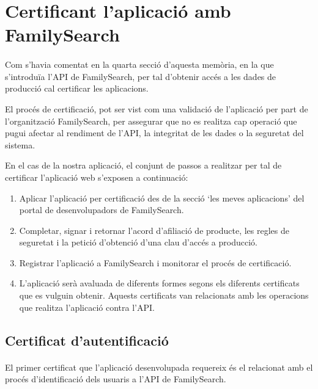\section{Certificant l'aplicació amb FamilySearch}\label{section:certification}

    \paragraph{}
    Com s'havia comentat en la quarta secció d'aquesta memòria, en la que s'introduïa l'API de FamilySearch, per tal d'obtenir accés a les dades de producció cal certificar les aplicacions.

    El procés de certificació, pot ser vist com una validació de l'aplicació per part de l'organització FamilySearch, per assegurar que no es realitza cap operació que pugui afectar al rendiment de l'API, la integritat de les dades o la seguretat del sistema.

    En el cas de la nostra aplicació, el conjunt de passos a realitzar per tal de certificar l'aplicació web s'exposen a continuació:

    \begin{enumerate}
        \item Aplicar l'aplicació per certificació des de la secció `les meves aplicacions' del portal de desenvolupadors de FamilySearch.
        \item Completar, signar i retornar l'acord d'afiliació de producte, les regles de seguretat i la petició d'obtenció d'una clau d'accés a producció.
        \item Registrar l'aplicació a FamilySearch i monitorar el procés de certificació.
        \item L'aplicació serà avaluada de diferents formes segons els diferents certificats que es vulguin obtenir. Aquests certificats van relacionats amb les operacions que realitza l'aplicació contra l'API.
    \end{enumerate}


    \subsection{Certificat d'autentificació}

    \paragraph{}
    El primer certificat que l'aplicació desenvolupada requereix és el relacionat amb el procés d'identificació dels usuaris a l'API de FamilySearch.

